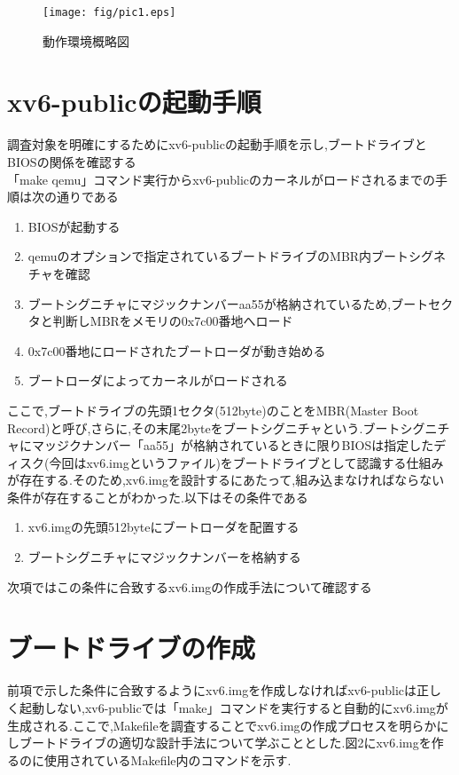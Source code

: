 \documentclass[submit,techreq,noauthor]{eco}	%
\begin{document}
\begin{figure}[H]
    \centering
    \texttt{[image: fig/pic1.eps]}
    \caption{動作環境概略図}
    \label{sample}
\end{figure}

\section{xv6-publicの起動手順}
調査対象を明確にするためにxv6-publicの起動手順を示し,ブートドライブとBIOSの関係を確認する\\
「make qemu」コマンド実行からxv6-publicのカーネルがロードされるまでの手順は次の通りである

\begin{enumerate}
\renewcommand{\labelenumi}{\arabic{enumi}).}
\item BIOSが起動する
\item qemuのオプションで指定されているブートドライブのMBR内ブートシグネチャを確認
\item ブートシグニチャにマジックナンバーaa55が格納されているため,ブートセクタと判断しMBRをメモリの0x7c00番地へロード
\item 0x7c00番地にロードされたブートローダが動き始める
\item ブートローダによってカーネルがロードされる
\end{enumerate}
 
ここで,ブートドライブの先頭1セクタ(512byte)のことをMBR(Master Boot Record)と呼び,さらに,その末尾2byteをブートシグニチャという.ブートシグニチャにマッジクナンバー「aa55」が格納されているときに限りBIOSは指定したディスク(今回はxv6.imgというファイル)をブートドライブとして認識する仕組みが存在する.そのため,xv6.imgを設計するにあたって,組み込まなければならない条件が存在することがわかった.以下はその条件である

\begin{enumerate}
\renewcommand{\labelenumi}{\arabic{enumi}).}
\item xv6.imgの先頭512byteにブートローダを配置する
\item ブートシグニチャにマジックナンバーを格納する
\end{enumerate}

次項ではこの条件に合致するxv6.imgの作成手法について確認する

\section{ブートドライブの作成}
前項で示した条件に合致するようにxv6.imgを作成しなければxv6-publicは正しく起動しない,xv6-publicでは「make」コマンドを実行すると自動的にxv6.imgが生成される.ここで,Makefileを調査することでxv6.imgの作成プロセスを明らかにしブートドライブの適切な設計手法について学ぶこととした.図2にxv6.imgを作るのに使用されているMakefile内のコマンドを示す.
\end{document}

